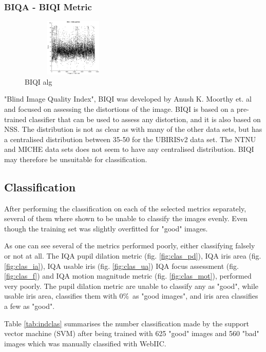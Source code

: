 \vspace{-5mm}
\subsubsection{BIQA - BIQI Metric}\vspace{-5mm}
	\begin{figure}
		\centering
		\includegraphics[height=2.75cm, width=5cm]{pics/biqa_dist_biqi_alg}
		\caption{BIQI alg \cite{biqi}}
		\label{fig:biqialg}
	\end{figure}
"Blind Image Quality Index", BIQI\cite{biqi} was developed by Anush K. Moorthy
et. al and focused on assessing the distortions of the image.  BIQI is based on
a pre-trained classifier that can be used to assess any distortion, and it is
also based on NSS.
The distribution is not as clear as with many of the other data sets, but has a
centralised distribution between 35-50 for the UBIRISv2 data set. The NTNU and
MICHE data sets does not seem to have any centralised distribution.
BIQI may therefore be unsuitable for classification.


\subsection{Classification}
After performing the classification on each of the selected metrics separately,
several of them where shown to be unable to classify the images evenly.  Even
though the training set was slightly overfitted for "good" images.

As one can see several of the metrics performed poorly, either classifying
falsely or not at all.  The IQA pupil dilation metric (fig. \ref{fig:clas_pd}),
IQA iris area (fig. \ref{fig:clas_ia}), IQA usable iris (fig. \ref{fig:clas_ua})
IQA focus assessment (fig. \ref{fig:clas_f}) and IQA motion magnitude metric
(fig. \ref{fig:clas_mot}), performed very poorly.  The pupil dilation metric are
unable to classify any as "good", while usable iris area, classifies them
with 0\%\ as "good images", and iris area classifies a few as "good".

Table \ref{tab:indclas} summarises the number classification made by the support
vector machine (SVM) after being trained with 625 "good" images and 560 "bad"
images which was manually classified with WebIIC\cite{webiic}.



